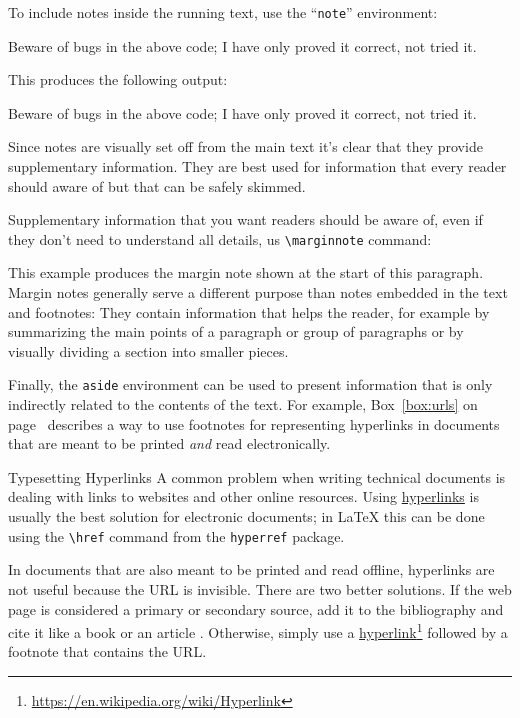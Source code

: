 \documentclass[minted]{codebook}
\begin{document}
To include notes inside the running text, use the ``\texttt{note}'' environment:
\begin{texcode}
\begin{note}
Beware of bugs in the above code;
I have only proved it correct, not tried it.
\end{note}
\end{texcode}
This produces the following output:
\begin{note}
Beware of bugs in the above code;
I have only proved it correct, not tried it.
\end{note}
Since notes are visually set off from the main text it's clear that they provide supplementary information.
They are best used for information that every reader should aware of but that can be safely skimmed.

Supplementary information that you want readers should be aware of, even if they don't need to understand all details, us \verb|\marginnote| command:
\begin{texcode}
\end{texcode}
This example produces the margin note shown at the start of this paragraph.
Margin notes generally serve a different purpose than notes embedded in the text and footnotes:
They contain information that helps the reader, for example by summarizing the main points of a paragraph or group of paragraphs or by visually dividing a section into smaller pieces.

Finally, the \verb|aside| environment can be used to present information that is only indirectly related to the contents of the text.
For example, Box~\ref{box:urls} on page~\pageref{box:urls} describes a way to use footnotes for representing hyperlinks in documents that are meant to be printed \emph{and} read electronically.

\begin{aside}{Typesetting Hyperlinks}
\label{box:urls}
A common problem when writing technical documents is dealing with links to websites and other online resources.
Using \href{https://en.wikipedia.org/wiki/Hyperlink}{hyperlinks} is usually the best solution for electronic documents;
in \LaTeX{} this can be done using the \verb|\href| command from the \verb|hyperref| package.

In documents that are also meant to be printed and read offline, hyperlinks are not useful because the URL is invisible.
There are two better solutions.
If the web page is considered a primary or secondary source, add it to the bibliography and cite it like a book or an article \cite{wikipedia:hyperlink}.
Otherwise, simply use a \href{https://en.wikipedia.org/wiki/Hyperlink}{hyperlink}\footnote{\url{https://en.wikipedia.org/wiki/Hyperlink}} followed by a footnote that contains the URL.
\end{aside}
\end{document}
